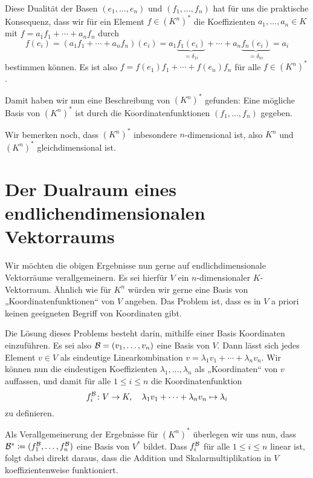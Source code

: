 \documentclass[a4paper,10pt]{article}
\begin{document}
Diese Dualität der Basen $(e_1, \dotsc, e_n)$ und $(f_1, \dotsc, f_n)$ hat für uns die praktische Konsequenz, dass wir für ein Element $f \in (K^n)^*$ die Koeffizienten $a_1, \dotsc, a_n \in K$ mit $f = a_1 f_1 + \dotsb + a_n f_n$ durch
\begin{equation}\label{eq: coefficients and duality}
 f(e_i)
 = (a_1 f_1 + \dotsb + a_n f_n)(e_i)
 = a_1 \underbrace{f_1(e_i)}_{=\delta_{1i}} + \dotsb + a_n \underbrace{f_n(e_i)}_{=\delta_{ni}}
 = a_i
\end{equation}
bestimmen können. Es ist also $f = f(e_1) f_1 + \dotsb + f(e_n) f_n$ für alle $f \in (K^n)^*$.

Damit haben wir nun eine Beschreibung von $(K^n)^*$ gefunden: Eine mögliche Basis von $(K^n)^*$ ist durch die Koordinatenfunktionen $(f_1, \dotsc, f_n)$ gegeben.

Wir bemerken noch, dass $(K^n)^*$ inbesondere $n$-dimensional ist, also $K^n$ und $(K^n)^*$ gleichdimensional ist.






\section{Der Dualraum eines endlichendimensionalen Vektorraums}
Wir möchten die obigen Ergebnisse nun gerne auf endlichdimensionale Vektorräume verallgemeinern. Es sei hierfür $V$ ein $n$-dimensionaler $K$-Vektorraum. Ähnlich wie für $K^n$ würden wir gerne eine Basis von „Koordinatenfunktionen“ von $V$ angeben. Das Problem ist, dass es in $V$ a priori keinen geeigneten Begriff von Koordinaten gibt.

Die Lösung dieses Problems besteht darin, mithilfe einer Basis Koordinaten einzuführen. Es sei also $\mathcal{B} = (v_1, \dotsc, v_n)$ eine Basis von $V$. Dann lässt sich jedes Element $v \in V$ als eindeutige Linearkombination $v = \lambda_1 v_1 + \dotsb + \lambda_n v_n$. Wir können nun die eindeutigen Koeffizienten $\lambda_1, \dotsc, \lambda_n$ als „Koordinaten“ von $v$ auffassen, und damit für alle $1 \leq i \leq n$ die Koordinatenfunktion
\[
 f^{\mathcal{B}}_i \colon V \to K, \quad \lambda_1 v_1 + \dotsb + \lambda_n v_n \mapsto \lambda_i
\]
zu definieren.

Als Verallgemeinerung der Ergebnisse für $(K^n)^*$ überlegen wir uns nun, dass $\mathcal{B}^* \coloneq (f^{\mathcal{B}}_1, \dotsc, f^{\mathcal{B}}_n)$ eine Basis von $V^*$ bildet. Dass $f^{\mathcal{B}}_i$ für alle $1 \leq i \leq n$ linear ist, folgt dabei direkt daraus, dass die Addition und Skalarmultiplikation in $V$ koeffizientenweise funktioniert.
\end{document}

